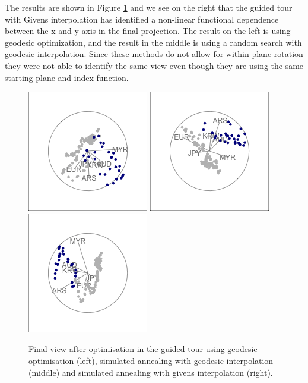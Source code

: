 The results are shown in Figure \ref{fig:rates-tour-static} and we see
on the right that the guided tour with Givens interpolation has
identified a non-linear functional dependence between the x and y axis
in the final projection. The result on the left is using geodesic
optimization, and the result in the middle is using a random search with
geodesic interpolation. Since these methods do not allow for
within-plane rotation they were not able to identify the same view even
though they are using the same starting plane and index function.

\begin{Schunk}
\begin{figure}

{\centering \includegraphics[width=0.3\linewidth]{rates_tour_geodesic_final} \includegraphics[width=0.3\linewidth]{rates_tour_better_final} \includegraphics[width=0.3\linewidth]{rates_tour_givens_final} 

}

\caption[Final view after optimisation in the guided tour using geodesic optimisation (left), simulated annealing with geodesic interpolation (middle) and simulated annealing with givens interpolation (right)]{Final view after optimisation in the guided tour using geodesic optimisation (left), simulated annealing with geodesic interpolation (middle) and simulated annealing with givens interpolation (right).}\label{fig:rates-tour-static}
\end{figure}
\end{Schunk}

